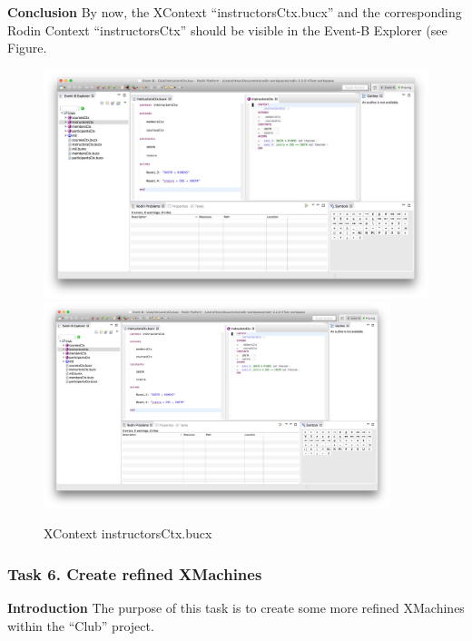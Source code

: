 \textbf{Conclusion} By now, the XContext ``instructorsCtx.bucx'' and the corresponding Rodin Context ``instructorsCtx'' should be visible in the Event-B Explorer (see Figure.
  \begin{figure}[!htbp]
    \centering
    \ifplastex
    \includegraphics[width=512]{figures/InstructorsCtx}
    \else
    \includegraphics[width=0.9\textwidth]{figures/InstructorsCtx}
    \fi
    \caption{XContext instructorsCtx.bucx}
    \label{fig:instructorsCtx}
  \end{figure}

\subsubsection{Task 6. Create refined XMachines}
\textbf{Introduction} The purpose of this task is to create some more refined XMachines within the ``Club'' project.

